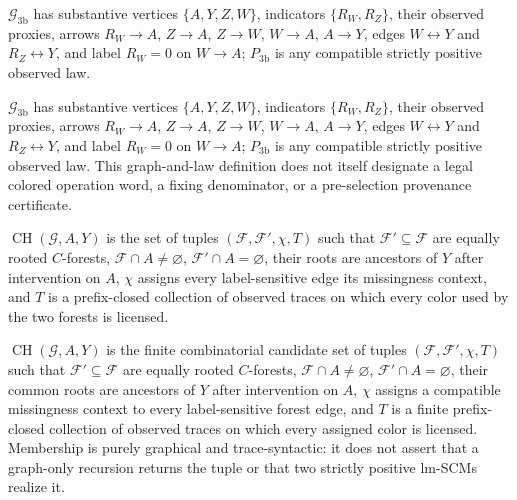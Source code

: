 \(\mathcal G_{\mathrm{3b}}\) has substantive vertices \(\{A,Y,Z,W\}\), indicators \(\{R_W,R_Z\}\), their observed proxies, arrows \(R_W\to A\), \(Z\to A\), \(Z\to W\), \(W\to A\), \(A\to Y\), edges \(W\leftrightarrow Y\) and \(R_Z\leftrightarrow Y\), and label \(R_W=0\) on \(W\to A\); \(P_{\mathrm{3b}}\) is any compatible strictly positive observed law.

\(\mathcal G_{\mathrm{3b}}\) has substantive vertices \(\{A,Y,Z,W\}\), indicators \(\{R_W,R_Z\}\), their observed proxies, arrows \(R_W\to A\), \(Z\to A\), \(Z\to W\), \(W\to A\), \(A\to Y\), edges \(W\leftrightarrow Y\) and \(R_Z\leftrightarrow Y\), and label \(R_W=0\) on \(W\to A\); \(P_{\mathrm{3b}}\) is any compatible strictly positive observed law. This graph-and-law definition does not itself designate a legal colored operation word, a fixing denominator, or a pre-selection provenance certificate.

\(\operatorname{CH}(\mathcal G,A,Y)\) is the set of tuples \((\mathcal F,\mathcal F',\chi,T)\) such that \(\mathcal F'\subseteq\mathcal F\) are equally rooted \(C\)-forests, \(\mathcal F\cap A\neq\varnothing\), \(\mathcal F'\cap A=\varnothing\), their roots are ancestors of \(Y\) after intervention on \(A\), \(\chi\) assigns every label-sensitive edge its missingness context, and \(T\) is a prefix-closed collection of observed traces on which every color used by the two forests is licensed.

\(\operatorname{CH}(\mathcal G,A,Y)\) is the finite combinatorial candidate set of tuples \((\mathcal F,\mathcal F',\chi,T)\) such that \(\mathcal F'\subseteq\mathcal F\) are equally rooted \(C\)-forests, \(\mathcal F\cap A\neq\varnothing\), \(\mathcal F'\cap A=\varnothing\), their common roots are ancestors of \(Y\) after intervention on \(A\), \(\chi\) assigns a compatible missingness context to every label-sensitive forest edge, and \(T\) is a finite prefix-closed collection of observed traces on which every assigned color is licensed. Membership is purely graphical and trace-syntactic: it does not assert that a graph-only recursion returns the tuple or that two strictly positive lm-SCMs realize it.

